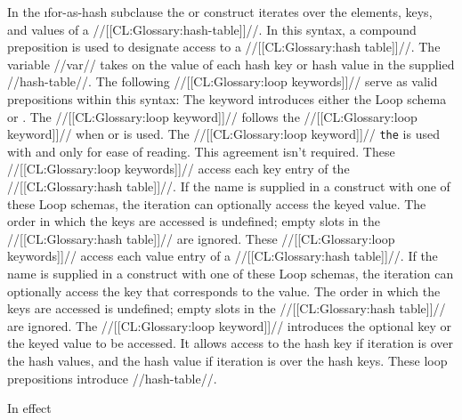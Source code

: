   In the \i{for-as-hash} subclause
  the  
  or  construct 
  iterates over the elements, keys, and values of a //[[CL:Glossary:hash-table]]//.
  In this syntax, a compound preposition is used to designate access to a
  //[[CL:Glossary:hash table]]//.
  The variable //var// takes on the value of each hash key
  or hash value in the supplied //hash-table//. 
  The following //[[CL:Glossary:loop keywords]]// serve as valid prepositions within this syntax:
  \beginlist
              The keyword  introduces either the Loop schema   or .
  The //[[CL:Glossary:loop keyword]]//  follows the //[[CL:Glossary:loop keyword]]//  when  or  is used.  The //[[CL:Glossary:loop keyword]]// {\tt the} is used with  and  only for ease of reading. This agreement isn't required.
  These //[[CL:Glossary:loop keywords]]// access each key entry of the //[[CL:Glossary:hash table]]//.  If  the name  is supplied in a  construct with one of these Loop schemas, the iteration can optionally access the keyed value. The order in which the keys are accessed is undefined; empty slots in the //[[CL:Glossary:hash table]]// are ignored.  
  These //[[CL:Glossary:loop keywords]]// access each value entry of a  //[[CL:Glossary:hash table]]//.  If  the name  is supplied in a  construct with one of these Loop schemas, the iteration can optionally access the key that corresponds to the value.  The order in which the keys are accessed is undefined; empty slots in the //[[CL:Glossary:hash table]]// are ignored. 
  The //[[CL:Glossary:loop keyword]]//  introduces  the optional key or the keyed value to be accessed.  It allows access to the hash key if iteration is over the hash values, and the hash value if  iteration is over the hash keys.
  These loop prepositions introduce //hash-table//.
  \endlist

In effect 

   

